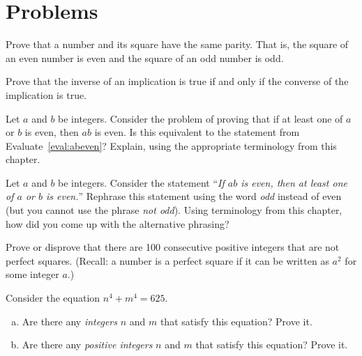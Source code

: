 \section{Problems}
\begin{pro}
Prove that a number and its square have the same parity.  That is, the square of an even number
is even and the square of an odd number is odd.
\end{pro}

\begin{pro}\label{pro:invConc}
Prove that the inverse of an implication is true if and only if the converse of the implication is true.
\end{pro}


\begin{pro}
Let $a$ and $b$ be integers.
Consider the problem of proving that if at least one of $a$ or $b$ is even, then $ab$ is even.
Is this equivalent to the statement from Evaluate~\ref{eval:abeven}?  Explain, using the appropriate
terminology from this chapter.
\end{pro}

\begin{pro}
Let $a$ and $b$ be integers. 
Consider the statement
``{\em If $ab$ is even, then at least one of $a$ or $b$ is even.}''
Rephrase this statement using the word {\em odd} instead of even (but you cannot use the phrase {\em not odd}). 
Using terminology from this chapter, how did you come up with the alternative phrasing?
\end{pro}

\begin{pro}
Prove or disprove that there are 100 consecutive positive integers that are not perfect squares.
(Recall: a number is a perfect square if it can be written as $a^2$ for some integer $a$.)
\end{pro}

\begin{pro}
Consider the equation $n^4+m^4=625$.  
\begin{enumerate}[(a)]
\item
Are there any {\em integers} $n$ and $m$ that satisfy this equation? Prove it.
\item
Are there any {\em positive integers} $n$ and $m$ that satisfy this equation? Prove it.
\end{enumerate}
\end{pro}

